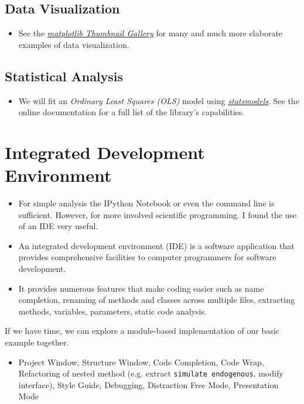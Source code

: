 \subsection{Data Visualization }
\begin{itemize}
\item See the \href{http://matplotlib.org/gallery.html}{\textit{matplotlib Thumbnail Gallery}} for many and much more elaborate examples of data visualization.
\end{itemize}
\subsection{Statistical Analysis}
\begin{itemize}
\item We will fit an \textit{Ordinary Least Squares (OLS)} model using \href{http://statsmodels.sourceforge.net}{\textit{statsmodels}}. See the online documentation for a full list of the library's capabilities.
\end{itemize}
\section{Integrated Development Environment}
\begin{itemize}
\item For simple analysis the IPython Notebook or even the command line is sufficient. However, for more involved scientific programming. I found the use of an IDE very useful.
\item An integrated development environment (IDE) is a software application that provides comprehensive facilities to computer programmers for software development.
\item It provides numerous features that make coding easier such as name completion, renaming of methods and classes across multiple files, extracting methods, variables, parameters, static code analysis.
\end{itemize}

If we have time, we can explore a  module-based implementation of our basic example together.
\begin{itemize}
\item Project Window, Structure Window, Code Completion, Code Wrap, Refactoring of nested method (e.g. extract \verb+simulate endogenous+, modify interface), Style Guide, Debugging, Distraction Free Mode, Presentation Mode
\end{itemize}

